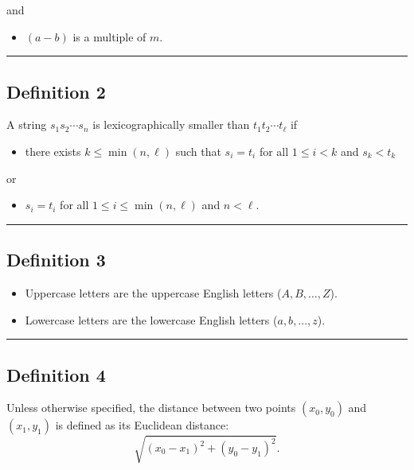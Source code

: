 \documentclass[noproblemids,a4paper]{problemset}
\begin{document}
\vskip-10pt
\hskip30pt and

\begin{itemize}
\item \vskip-10pt $(a-b)$ is a multiple of $m$.
\end{itemize}

\vskip 20pt
\hrule
\vskip 20pt

\subsection*{Definition 2}

A string $s_1s_2 \cdots s_n$ is lexicographically smaller than $t_1t_2\cdots t_\ell$ if

\begin{itemize}
\item there exists $k \leq \min(n,\ell)$ such that $s_i = t_i$ for all $1 \leq i < k$ and $s_k < t_k$
\end{itemize}

\vskip-10pt
\hskip30pt or

\begin{itemize}
\item \vskip-10pt $s_i = t_i$ for all $1 \leq i \leq \min(n,\ell)$ and $n < \ell$.
\end{itemize}

\vskip 20pt
\hrule
\vskip 20pt

\subsection*{Definition 3}

\begin{itemize}
\item Uppercase letters are the uppercase English letters ($A, B, \dots , Z$).
\item Lowercase letters are the lowercase English letters ($a, b, \dots , z$).
\end{itemize}

\vskip 20pt
\hrule
\vskip 20pt

\subsection*{Definition 4}

Unless otherwise specified, the distance between two points $(x_0, y_0)$ and $(x_1, y_1)$ is defined as its Euclidean distance: $$\sqrt{(x_0-x_1)^2 + (y_0-y_1)^2}.$$


\end{document}

